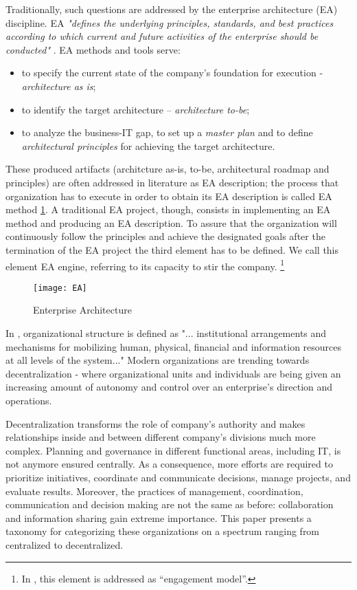 Traditionally, such questions are addressed by the enterprise architecture (EA) discipline. 
EA \textit{"defines the underlying principles, standards, and best practices according to which current and future activities of the enterprise should be conducted"} \cite{schekkerman2004}. EA methods and tools serve:
\begin{itemize}
\item to specify the current state of the company's foundation for execution \cite{ross2006}  - \textit{architecture as is};
\item to identify the target architecture – \textit{architecture to-be};
\item to analyze the business-IT gap, to set up a \textit{master plan} and to define \textit{architectural principles} for achieving the target architecture.
\end{itemize}
These produced artifacts (architcture as-is, to-be, architectural roadmap and principles) are often addressed in literature as EA description; the process that organization has to execute in order to obtain its EA description is called EA method \ref{fig:EA_general}. A traditional EA project, though, consists in implementing an EA method and producing an EA description. To assure that the organization will continuously follow the principles and achieve the designated goals after the termination of the EA project   the third element has to be defined.  We call this element EA engine, referring to its capacity to stir the company. \footnote{In \cite{ross2006}, this element is addressed as “engagement model”.}
\begin{figure}
\centering
\texttt{[image: EA]}
\caption{Enterprise Architecture}
\label{fig:EA_general}
\end{figure}
In \cite{sachdeva1990}, organizational structure is defined as "... institutional arrangements and mechanisms for mobilizing human, physical, financial and information resources at all levels of the system..." Modern organizations are trending towards decentralization - where organizational units and individuals are being given an increasing amount of autonomy and control over an enterprise's direction and operations.

Decentralization transforms the role of company's authority and makes relationships inside and between different company's divisions much more complex. Planning and governance in different functional areas, including IT,  is not anymore ensured centrally. As a consequence, more efforts are required to prioritize initiatives, coordinate and communicate decisions, manage projects, and evaluate results. Moreover, the practices of management, coordination, communication and decision making are not the same as before: collaboration and information sharing gain extreme importance. This paper presents a taxonomy for categorizing these organizations on a spectrum ranging from centralized to decentralized. 


